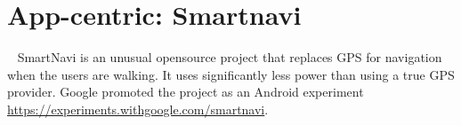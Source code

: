 



\section{App-centric: Smartnavi}~\label{case-study-overview-smartnavi}
SmartNavi is an unusual opensource project that replaces GPS for navigation when the users are walking. It uses significantly less power than using a true GPS provider. Google promoted the project as an Android experiment \url{https://experiments.withgoogle.com/smartnavi}.

